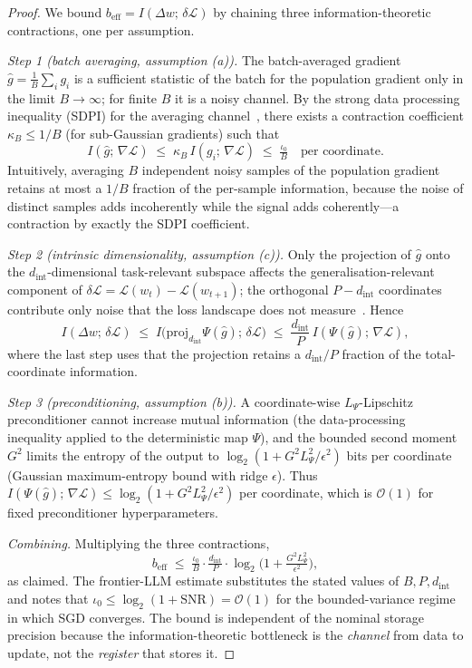 \documentclass[11pt]{article}
\theoremstyle{definition}
\theoremstyle{remark}
\begin{document}
\begin{proof}
We bound $b_{\mathrm{eff}}=I(\Delta w;\,\delta\mathcal{L})$ by chaining
three information-theoretic contractions, one per assumption.

\emph{Step 1 (batch averaging, assumption (a)).}
The batch-averaged gradient $\hat{g}=\tfrac{1}{B}\sum_{i}g_{i}$ is a
sufficient statistic of the batch for the population gradient only in
the limit $B\to\infty$; for finite $B$ it is a noisy channel.  By the
strong data processing inequality (SDPI) for the averaging
channel~\cite{raginsky2016strong}, there exists a contraction
coefficient $\kappa_{B}\le 1/B$ (for sub-Gaussian gradients) such that
\[
  I(\hat{g};\,\nabla\mathcal{L})\;\le\;\kappa_{B}\,
  I(g_{i};\,\nabla\mathcal{L})\;\le\;\tfrac{\iota_{0}}{B}
  \quad\text{per coordinate.}
\]
Intuitively, averaging $B$ independent noisy samples of the
population gradient retains at most a $1/B$ fraction of the
per-sample information, because the noise of distinct samples adds
incoherently while the signal adds coherently---a contraction by
exactly the SDPI coefficient.

\emph{Step 2 (intrinsic dimensionality, assumption (c)).}
Only the projection of $\hat{g}$ onto the $d_{\mathrm{int}}$-dimensional
task-relevant subspace affects the generalisation-relevant component
of $\delta\mathcal{L}=\mathcal{L}(w_{t})-\mathcal{L}(w_{t+1})$; the
orthogonal $P-d_{\mathrm{int}}$ coordinates contribute only noise that
the loss landscape does not measure~\cite{li2018measuring}.  Hence
\[
  I(\Delta w;\,\delta\mathcal{L})
  \;\le\;
  I\!\bigl(\mathrm{proj}_{d_{\mathrm{int}}}\Psi(\hat{g});\,\delta\mathcal{L}\bigr)
  \;\le\;\frac{d_{\mathrm{int}}}{P}\,I(\Psi(\hat{g});\,\nabla\mathcal{L}),
\]
where the last step uses that the projection retains a
$d_{\mathrm{int}}/P$ fraction of the total-coordinate information.

\emph{Step 3 (preconditioning, assumption (b)).}
A coordinate-wise $L_{\Psi}$-Lipschitz preconditioner cannot increase
mutual information (the data-processing inequality applied to the
deterministic map $\Psi$), and the bounded second moment
$G^{2}$ limits the entropy of the output to
$\log_{2}(1+G^{2}L_{\Psi}^{2}/\epsilon^{2})$ bits per coordinate
(Gaussian maximum-entropy bound with ridge $\epsilon$).  Thus
$I(\Psi(\hat{g});\,\nabla\mathcal{L})\le
\log_{2}(1+G^{2}L_{\Psi}^{2}/\epsilon^{2})$ per coordinate, which is
$\mathcal{O}(1)$ for fixed preconditioner hyperparameters.

\emph{Combining.}
Multiplying the three contractions,
\[
  b_{\mathrm{eff}}
  \;\le\;\tfrac{\iota_{0}}{B}\cdot\tfrac{d_{\mathrm{int}}}{P}\cdot
  \log_{2}\!\bigl(1+\tfrac{G^{2}L_{\Psi}^{2}}{\epsilon^{2}}\bigr),
\]
as claimed.  The frontier-LLM estimate substitutes the stated values
of $B,P,d_{\mathrm{int}}$ and notes that
$\iota_{0}\le\log_{2}(1+\mathrm{SNR})=\mathcal{O}(1)$ for the
bounded-variance regime in which SGD converges.  The bound is
independent of the nominal storage precision because the
information-theoretic bottleneck is the \emph{channel} from data to
update, not the \emph{register} that stores it.
\end{proof}
\end{document}
